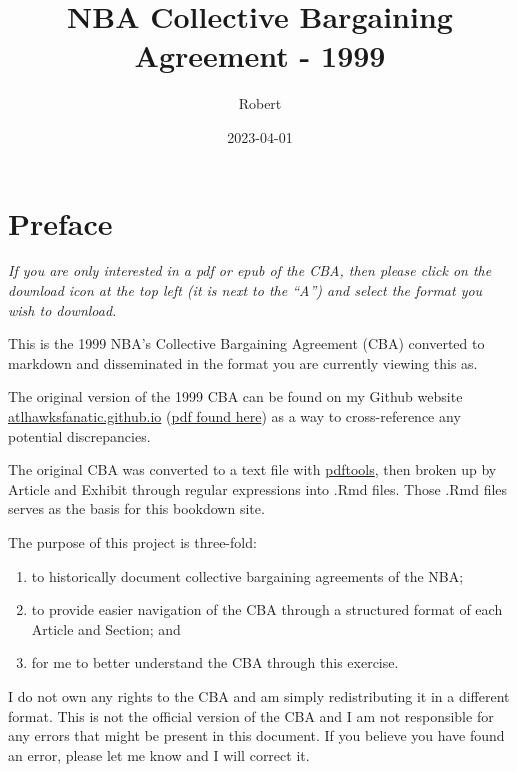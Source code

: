 \documentclass[
]{book}
\title{NBA Collective Bargaining Agreement - 1999}
\author{Robert}
\date{2023-04-01}
\providecommand{\tightlist}{%
  \setlength{\itemsep}{0pt}\setlength{\parskip}{0pt}}
\begin{document}
\maketitle

{
\setcounter{tocdepth}{1}
\tableofcontents
}
\hypertarget{preface}{%
\chapter*{Preface}\label{preface}}

\emph{If you are only interested in a pdf or epub of the CBA, then please click on the download icon at the top left (it is next to the ``A'') and select the format you wish to download.}

This is the 1999 NBA's Collective Bargaining Agreement (CBA) converted to markdown and disseminated in the format you are currently viewing this as.

The original version of the 1999 CBA can be found on my Github website \href{https://atlhawksfanatic.github.io/}{atlhawksfanatic.github.io} (\href{https://github.com/atlhawksfanatic/atlhawksfanatic.github.io/raw/master/research/CBA/1999-NBA-NBPA-Collective-Bargaining-Agreement.pdf}{pdf found here}) as a way to cross-reference any potential discrepancies.

The original CBA was converted to a text file with \href{https://github.com/ropensci/pdftools}{pdftools}, then broken up by Article and Exhibit through regular expressions into .Rmd files. Those .Rmd files serves as the basis for this bookdown site.

The purpose of this project is three-fold:

\begin{enumerate}
\def\labelenumi{\arabic{enumi}.}
\tightlist
\item
  to historically document collective bargaining agreements of the NBA;
\item
  to provide easier navigation of the CBA through a structured format of each Article and Section; and
\item
  for me to better understand the CBA through this exercise.
\end{enumerate}

I do not own any rights to the CBA and am simply redistributing it in a different format. This is not the official version of the CBA and I am not responsible for any errors that might be present in this document. If you believe you have found an error, please let me know and I will correct it.
\end{document}
